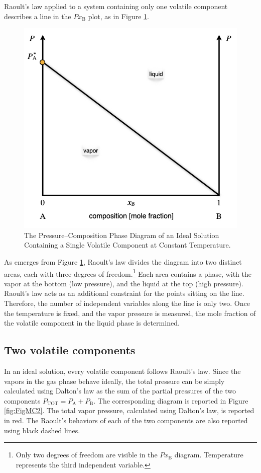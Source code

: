 \documentclass[
  9pt,
]{extbook}
\theoremstyle{definition}
\theoremstyle{definition}
\theoremstyle{definition}
\theoremstyle{remark}
\begin{document}
Raoult's law applied to a system containing only one volatile component describes a line in the \(Px_{\text{B}}\) plot, as in Figure \ref{fig:FigMC1}.

\begin{figure}

{\centering \includegraphics[width=0.6\linewidth]{./img/OEP_Figures.019} 

}

\caption{The Pressure–Composition Phase Diagram of an Ideal Solution Containing a Single Volatile Component at Constant Temperature.}\label{fig:FigMC1}
\end{figure}

As emerges from Figure \ref{fig:FigMC1}, Raoult's law divides the diagram into two distinct areas, each with three degrees of freedom.\footnote{Only two degrees of freedom are visible in the \(Px_{\text{B}}\) diagram. Temperature represents the third independent variable.} Each area contains a phase, with the vapor at the bottom (low pressure), and the liquid at the top (high pressure). Raoult's law acts as an additional constraint for the points sitting on the line. Therefore, the number of independent variables along the line is only two. Once the temperature is fixed, and the vapor pressure is measured, the mole fraction of the volatile component in the liquid phase is determined.

\hypertarget{two-volatile-components}{%
\subsection{Two volatile components}\label{two-volatile-components}}

In an ideal solution, every volatile component follows Raoult's law. Since the vapors in the gas phase behave ideally, the total pressure can be simply calculated using Dalton's law as the sum of the partial pressures of the two components \(P_{\text{TOT}}=P_{\text{A}}+P_{\text{B}}\). The corresponding diagram is reported in Figure \ref{fig:FigMC2}. The total vapor pressure, calculated using Dalton's law, is reported in red. The Raoult's behaviors of each of the two components are also reported using black dashed lines.
\end{document}
